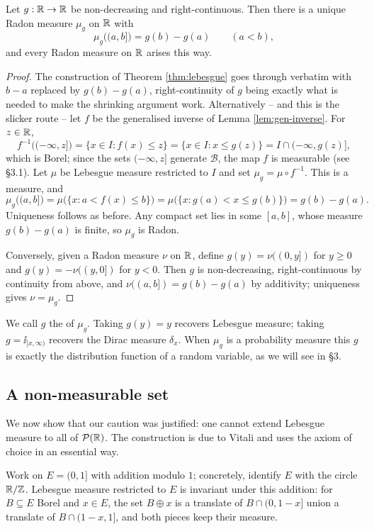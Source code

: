 \documentclass[a4paper]{scrartcl}
\newcommand{\cB}{\mathcal{B}}
\newcommand{\ind}{\ii}
\begin{document}
\begin{theorem}\label{thm:stieltjes}
	Let $g : \mathbb{R} \to \mathbb{R}$ be non-decreasing and right-continuous. Then there is a unique Radon measure $\mu_g$ on $\mathbb{R}$ with
	$$
	\mu_g\big((a,b]\big) = g(b) - g(a) \qquad (a<b),
	$$
	and every Radon measure on $\mathbb{R}$ arises this way.
\end{theorem}
\begin{proof}
	The construction of Theorem \ref{thm:lebesgue} goes through verbatim with $b - a$ replaced by $g(b)-g(a)$, right-continuity of $g$ being exactly what is needed to make the shrinking argument work. Alternatively -- and this is the slicker route -- let $f$ be the generalised inverse of Lemma \ref{lem:gen-inverse}. For $z \in \mathbb{R}$,
	$$
	f^{-1}\big((-\infty, z]\big) = \{x \in I : f(x)\leq z\} = \{x \in I : x \leq g(z)\} = I \cap (-\infty, g(z)],
	$$
	which is Borel; since the sets $(-\infty,z]$ generate $\cB$, the map $f$ is measurable (see \S3.1). Let $\mu$ be Lebesgue measure restricted to $I$ and set $\mu_g = \mu \circ f^{-1}$. This is a measure, and
	$$
	\mu_g\big((a,b]\big) = \mu\big(\{x : a < f(x) \leq b\}\big) = \mu\big(\{x : g(a) < x \leq g(b)\}\big) = g(b)-g(a).
	$$
	Uniqueness follows as before. Any compact set lies in some $[a,b]$, whose measure $g(b)-g(a)$ is finite, so $\mu_g$ is Radon.

	Conversely, given a Radon measure $\nu$ on $\mathbb{R}$, define $g(y) = \nu((0,y])$ for $y \geq 0$ and $g(y) = -\nu((y,0])$ for $y<0$. Then $g$ is non-decreasing, right-continuous by continuity from above, and $\nu((a,b]) = g(b)-g(a)$ by additivity; uniqueness gives $\nu = \mu_g$.
\end{proof}

We call $g$ the  of $\mu_g$. Taking $g(y)=y$ recovers Lebesgue measure; taking $g = \ind_{[x,\infty)}$ recovers the Dirac measure $\delta_x$. When $\mu_g$ is a probability measure this $g$ is exactly the distribution function of a random variable, as we will see in \S3.

\subsection{A non-measurable set}

We now show that our caution was justified: one cannot extend Lebesgue measure to all of $\mathcal{P}(\mathbb{R})$. The construction is due to Vitali and uses the axiom of choice in an essential way.

Work on $E = (0,1]$ with addition modulo $1$; concretely, identify $E$ with the circle $\mathbb{R}/\mathbb{Z}$. Lebesgue measure restricted to $E$ is invariant under this addition: for $B \subseteq E$ Borel and $x \in E$, the set $B \oplus x$ is a translate of $B \cap (0, 1-x]$ union a translate of $B \cap (1-x, 1]$, and both pieces keep their measure.
\end{document}

